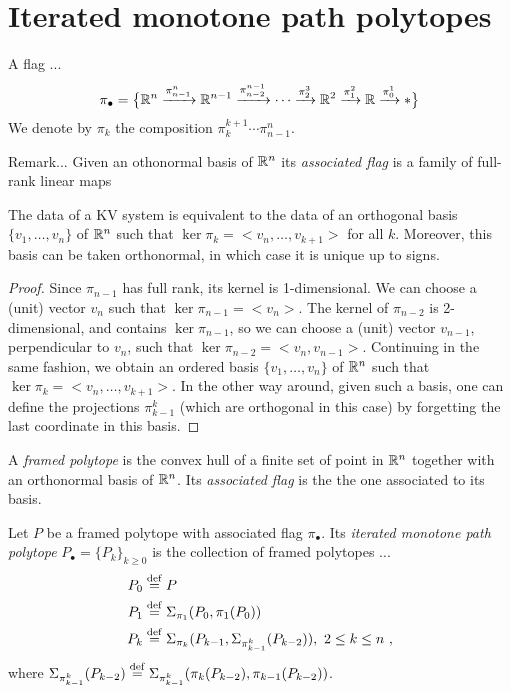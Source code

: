 
\section{Iterated monotone path polytopes}


\begin{definition}
	A flag ...
	\[
	\pi_\bullet = \big\{
	\mathbb{R}^n \xrightarrow{\pi^n_{n-1}} \mathbb{R}^{n-1} \xrightarrow{\pi^{n-1}_{n-2}} \dotsb \xrightarrow{\pi^3_{2}} \mathbb{R}^2 \xrightarrow{\pi^2_1} \mathbb{R} \xrightarrow{\pi^1_0} *
	\big\}
	\]
	We denote by $\pi_k$ the composition $\pi^{k+1}_{k}\cdots\pi^n_{n-1}$.
\end{definition}

Remark... 	Given an othonormal basis of $\mathbb{R}^n$ its \textit{associated flag} is a family of full-rank linear maps

\begin{lemma}
	The data of a KV system is equivalent to the data of an orthogonal basis $\{v_1,\ldots,v_n\}$ of $\mathbb{R}^n$ such that $\ker \pi_k= <v_n, \ldots, v_{k+1}>$ for all $k$.
	Moreover, this basis can be taken orthonormal, in which case it is unique up to signs.
\end{lemma}

\begin{proof}
	Since $\pi_{n-1}$ has full rank, its kernel is 1-dimensional.
	We can choose a (unit) vector $v_n$ such that $\ker \pi_{n-1} = <v_n>$.
	The kernel of $\pi_{n-2}$ is 2-dimensional, and contains $\ker \pi_{n-1}$, so we can choose a (unit) vector $v_{n-1}$, perpendicular to $v_n$, such that $\ker \pi_{n-2}=<v_n,v_{n-1}>$.
	Continuing in the same fashion, we obtain an ordered basis $\{v_1,\ldots, v_n\}$ of $\mathbb{R}^n$ such that $\ker \pi_{k}=<v_n,\ldots,v_{k+1}>$.
	In the other way around, given such a basis, one can define the projections $\pi^{k}_{k-1}$ (which are orthogonal in this case) by forgetting the last coordinate in this basis.
\end{proof}

\begin{definition}
	A \textit{framed polytope} is the convex hull of a finite set of point in $\mathbb{R}^n$ together with an orthonormal basis of $\mathbb{R}^n$.
	Its \textit{associated flag} is the the one associated to its basis.
\end{definition}

\begin{definition}
	Let $P$ be a framed polytope with associated flag $\pi_\bullet$.
	Its \textit{iterated monotone path polytope} $P_\bullet = \{P_k\}_{k \geq 0}$ is the collection of framed polytopes ...
	\begin{align*}
		P_0 & \stackrel{\mathrm{def}}{=} P \\
		P_1 & \stackrel{\mathrm{def}}{=} \Sigma_{\pi_1}(P_0,\pi_1(P_0)) \\
		P_k & \stackrel{\mathrm{def}}{=} \Sigma_{\pi_k}(P_{k-1},\Sigma_{\pi^{k}_{k-1}}(P_{k-2})), \ 2 \leq k \leq n \ ,
	\end{align*}
	where $\Sigma_{\pi^{k}_{k-1}}(P_{k-2})\stackrel{\mathrm{def}}{=} \Sigma_{\pi^{k}_{k-1}}(\pi_k(P_{k-2}),\pi_{k-1}(P_{k-2}))$.
\end{definition}

